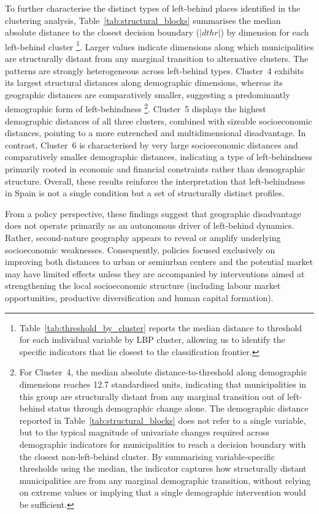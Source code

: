\documentclass[a4paper,11pt,oneside]{article}
\begin{document}
To further characterise the distinct types of left-behind places identified in the clustering analysis, Table~\ref{tab:structural_blocks} summarises the median absolute distance to the closest decision boundary (\(|dthr|\)) by dimension for each left-behind cluster \footnote{Table~\ref{tab:threshold_by_cluster} reports the median distance to threshold for each individual variable by LBP cluster, allowing us to identify the specific indicators that lie closest to the classification frontier.}. Larger values indicate dimensions along which municipalities are structurally distant from any marginal transition to alternative clusters. The patterns are strongly heterogeneous across left-behind types. Cluster~4 exhibits its largest structural distances along demographic dimensions, whereas its geographic distances are comparatively smaller, suggesting a predominantly demographic form of left-behindness \footnote{For Cluster~4, the median absolute distance-to-threshold along demographic dimensions reaches 12.7 standardised units, indicating that municipalities in this group are structurally distant from any marginal transition out of left-behind status through demographic change alone. The demographic distance reported in Table~\ref{tab:structural_blocks} does not refer to a single variable, but to the typical magnitude of univariate changes required across demographic indicators for municipalities to reach a decision boundary with the closest non-left-behind cluster. By summarising variable-specific thresholds using the median, the indicator captures how structurally distant municipalities are from any marginal demographic transition, without relying on extreme values or implying that a single demographic intervention would be sufficient.
}. Cluster~5 displays the highest demographic distances of all three clusters, combined with sizeable socioeconomic distances, pointing to a more entrenched and multidimensional disadvantage. In contrast, Cluster~6 is characterised by very large socioeconomic distances and comparatively smaller demographic distances, indicating a type of left-behindness primarily rooted in economic and financial constraints rather than demographic structure. Overall, these results reinforce the interpretation that left-behindness in Spain is not a single condition but a set of structurally distinct profiles.



From a policy perspective, these findings suggest that geographic disadvantage does not operate primarily as an autonomous driver of left-behind dynamics. Rather, second-nature geography appears to reveal or amplify underlying socioeconomic weaknesses. Consequently, policies focused exclusively on improving both distances to urban or semiurban centers and the potential market may have limited effects unless they are accompanied by interventions aimed at strengthening the local socioeconomic structure (including labour market opportunities, productive diversification and human capital formation).
\end{document}
